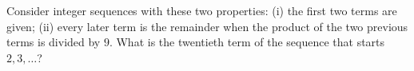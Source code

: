 Consider integer sequences with these two properties: (i) the first two terms are given; (ii) every later term is the remainder when the product of the two previous terms is divided by $9$. What is the twentieth term of the sequence that starts $2,3,\dots$?
